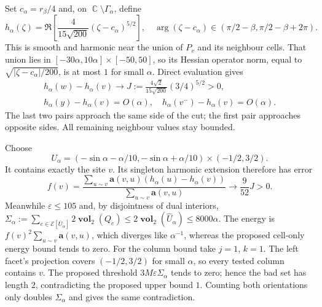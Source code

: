 \documentclass[12pt]{amsart}
\numberwithin{equation}{section}
\DeclareMathOperator{\R}{\mathbb{R}}
\DeclareMathOperator{\C}{\mathbb{C}}
\newtheorem{lemma}[theorem]{Lemma}
\newcommand*{\Rd}{\ensuremath{\mathbb{R}^d}}
\newcommand{\V}{\mathcal{V}}
\newcommand{\E}{\mathcal{E}}
\newcommand{\eps}{\varepsilon}
\newcommand{\proj}{\boldsymbol{\mathrm{proj}}}
\newcommand{\cond}{\hyperref[eq:geometric-laplacian]{\mathbf{a}}}
\newcommand{\GCU}{\hyperref[eq:graph-closure]{\widehat{U}}}
\newcommand{\Lyj}{\hyperref[eq:line-project]{L_y^{(j)}}}
\DeclareMathOperator{\vol}{\mathbf{vol}}
\begin{document}
Set $c_\alpha=r_\beta/4$ and, on $\C\setminus\Gamma_\alpha$, define
\[
 h_\alpha(\zeta)=\Re\left[\frac4{15\sqrt{200}}(\zeta-c_\alpha)^{5/2}\right],
 \quad\arg(\zeta-c_\alpha)\in(\pi/2-\beta,\pi/2-\beta+2\pi).
\]
This is smooth and harmonic near the union of $P_v$ and its neighbour cells. That union lies in $[-30\alpha,10\alpha]\times[-50,50]$, so its Hessian operator norm, equal to $\sqrt{|\zeta-c_\alpha|/200}$, is at most $1$ for small $\alpha$. Direct evaluation gives
\[
 \begin{gathered}
 h_\alpha(w)-h_\alpha(v)\to J:=\frac{4\sqrt2}{15\sqrt{200}}(3/4)^{5/2}>0,
 \\
 h_\alpha(y)-h_\alpha(v)=O(\alpha),\quad
 h_\alpha(v^-)-h_\alpha(v)=O(\alpha).
 \end{gathered}
\]
The last two pairs approach the same side of the cut; the first pair approaches opposite sides. All remaining neighbour values stay bounded.

Choose
\[
 U_\alpha=(-\sin\alpha-\alpha/10,-\sin\alpha+\alpha/10)\times(-1/2,3/2).
\]
It contains exactly the site $v$. Its singleton harmonic extension therefore has error
\[
 f(v)=\frac{\sum_{u\sim v}\cond(v,u)(h_\alpha(u)-h_\alpha(v))}
                 {\sum_{u\sim v}\cond(v,u)}\longrightarrow\frac9{52}J>0.
\]
Meanwhile $\eps\leq105$ and, by disjointness of dual interiors,
$\Sigma_\alpha:=\sum_{e\in\E[\overline U_\alpha]}2\vol_2(Q_e)\leq2\vol_2(\widehat U_\alpha)\leq8000\alpha$.
The energy is $f(v)^2\sum_{u\sim v}\cond(v,u)$, which diverges like $\alpha^{-1}$, whereas the proposed cell-only energy bound tends to zero. For the column bound take $j=1$, $k=1$. The left facet's projection covers $(-1/2,3/2)$ for small $\alpha$, so every tested column contains $v$. The proposed threshold $3M\eps\Sigma_\alpha$ tends to zero; hence the bad set has length $2$, contradicting the proposed upper bound $1$. Counting both orientations only doubles $\Sigma_\alpha$ and gives the same contradiction.

%
\end{document}
